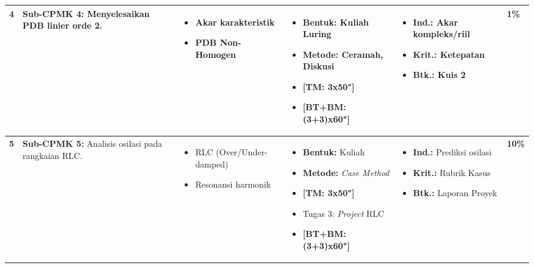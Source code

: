 \documentclass[11pt,a4paper]{article}
\begin{document}
\begin{longtable}{|C{0.6cm}|L{4.2cm}|L{4.5cm}|L{4.5cm}|L{3.5cm}|C{1.1cm}|}
\textbf{4} & \textbf{Sub-CPMK 4:} Menyelesaikan PDB linier orde 2. & \vspace{-4mm} \begin{itemize}[leftmargin=*, noitemsep] \item Akar karakteristik \item PDB Non-Homogen \end{itemize} \vspace{-4mm} & \vspace{-4mm} \begin{itemize}[leftmargin=*, noitemsep] \item \textbf{Bentuk:} Kuliah Luring \item \textbf{Metode:} Ceramah, Diskusi \item \textbf{[TM: 3x50"]} \item \textbf{[BT+BM: (3+3)x60"]} \end{itemize} \vspace{-4mm} & \vspace{-4mm} \begin{itemize}[leftmargin=*, noitemsep] \item \textbf{Ind.:} Akar kompleks/riil \item \textbf{Krit.:} Ketepatan \item \textbf{Btk.:} Kuis 2 \end{itemize} \vspace{-4mm} & \textbf{1\%} \\ \hline

\textbf{5} & \textbf{Sub-CPMK 5:} Analisis osilasi pada rangkaian RLC. & \vspace{-4mm} \begin{itemize}[leftmargin=*, noitemsep] \item RLC (Over/Under-damped) \item Resonansi harmonik \end{itemize} \vspace{-4mm} & \vspace{-4mm} \begin{itemize}[leftmargin=*, noitemsep] \item \textbf{Bentuk:} Kuliah \item \textbf{Metode:} \textit{Case Method} \item \textbf{[TM: 3x50"]} \item Tugas 3: \textit{Project} RLC \item \textbf{[BT+BM: (3+3)x60"]} \end{itemize} \vspace{-4mm} & \vspace{-4mm} \begin{itemize}[leftmargin=*, noitemsep] \item \textbf{Ind.:} Prediksi osilasi \item \textbf{Krit.:} Rubrik Kasus \item \textbf{Btk.:} Laporan Proyek \end{itemize} \vspace{-4mm} & \textbf{10\%} \\ \hline


\end{longtable}
\end{document}
